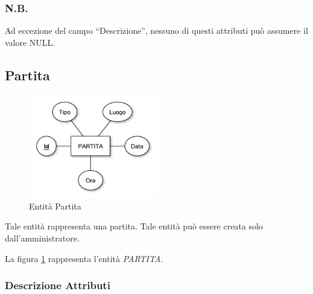 		\subsubsection*{N.B.}
		Ad eccezione del campo ``Descrizione'', nessuno di questi attributi può assumere il valore NULL.
	
	\subsection{Partita}
		
		\begin{figure}[h]
			\centering
			\includegraphics[width=0.5\textwidth]
			{immagini/07-partita}
			
			\caption{Entità Partita}
			\label{entita-partita}
		\end{figure}
		
		Tale entità rappresenta una partita. Tale entità può essere creata solo dall'amministratore.
		
		La figura \ref{entita-partita} rappresenta l'entità \emph{PARTITA}.
		
		\subsubsection*{Descrizione Attributi}
		
